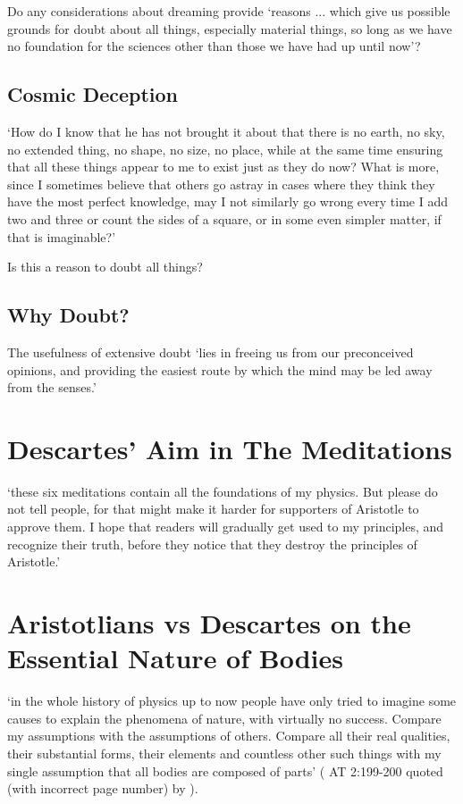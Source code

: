 \documentclass[12pt]{extarticle}
\begin{document}
\begin{multicols*}{3}
Do any considerations about dreaming provide 
‘reasons ... which give us possible grounds for doubt about all things, especially material things, so long as we have no foundation for the sciences other than those we have had up until now’?


\subsection{Cosmic Deception}
‘How do I know that he has not brought it about that there is no earth, 
no sky, no extended thing, no shape, no size, no place, while at the same 
time ensuring that all these things appear to me to exist just as they do now? 
What is more, since I sometimes believe that others go astray in cases 
where they think they have the most perfect knowledge, 
may I not similarly go wrong every time I add two and three or count the 
sides of a square, or in some even simpler matter, if that is imaginable?’

Is this a reason to doubt all things?

\subsection{Why Doubt?}

The usefulness of extensive doubt ‘lies in freeing us from our preconceived opinions,
and providing the easiest route by which the mind may be led away from the senses.’
  
 
\section{Descartes’ Aim in The Meditations}
 
‘these six meditations contain all the foundations of my physics.  But please do not tell people, for that might make it harder for supporters of Aristotle to approve them.  I hope that readers will gradually get used to my principles, and recognize their truth,  before they notice that  they destroy the principles of Aristotle.’ 

 
\section{Aristotlians vs Descartes on the Essential Nature of Bodies}
 
‘in the whole history of physics up to now people have
only tried to imagine some causes to explain the phenomena of nature, with
virtually no success.
Compare my assumptions with the assumptions of others.
Compare all their real qualities, their substantial forms, their elements and
countless other such things
with 
my single assumption that 
all bodies are composed of parts’
(\citealp[p.~107]{descartes:1984_vol3} AT 2:199-200 quoted (with incorrect page number) by \citealp{sorell:2018_experimental}).
 

\end{multicols*}
\end{document}
